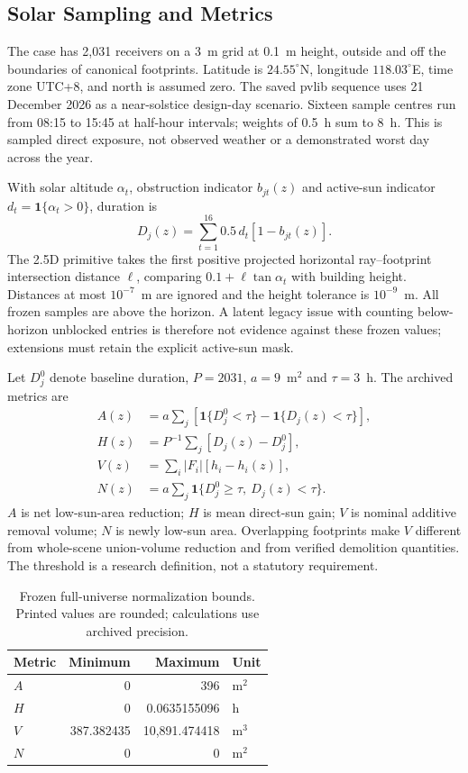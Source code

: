 \documentclass{llncs}
\newcommand{\ind}{\mathbf{1}}
\begin{document}
\subsection{Solar Sampling and Metrics}
The case has 2,031 receivers on a 3~m grid at 0.1~m height, outside and off the boundaries of canonical footprints. Latitude is $24.55^\circ$N, longitude $118.03^\circ$E, time zone UTC+8, and north is assumed zero. The saved pvlib sequence uses 21 December 2026 as a near-solstice design-day scenario. Sixteen sample centres run from 08:15 to 15:45 at half-hour intervals; weights of 0.5~h sum to 8~h. This is sampled direct exposure, not observed weather or a demonstrated worst day across the year.

With solar altitude $\alpha_t$, obstruction indicator $b_{jt}(z)$ and active-sun indicator $d_t=\ind\{\alpha_t>0\}$, duration is
\begin{equation}
 D_j(z)=\sum_{t=1}^{16}0.5\,d_t[1-b_{jt}(z)].
\label{eq:duration}
\end{equation}
The 2.5D primitive takes the first positive projected horizontal ray--footprint intersection distance $\ell$, comparing $0.1+\ell\tan\alpha_t$ with building height. Distances at most $10^{-7}$~m are ignored and the height tolerance is $10^{-9}$~m. All frozen samples are above the horizon. A latent legacy issue with counting below-horizon unblocked entries is therefore not evidence against these frozen values; extensions must retain the explicit active-sun mask.

Let $D_j^0$ denote baseline duration, $P=2031$, $a=9$~m$^2$ and $\tau=3$~h. The archived metrics are
\begin{align}
 A(z)&=a\sum_j[\ind\{D_j^0<\tau\}-\ind\{D_j(z)<\tau\}],\label{eq:A}\\
 H(z)&=P^{-1}\sum_j[D_j(z)-D_j^0],\label{eq:H}\\
 V(z)&=\sum_i|F_i|[h_i-h_i(z)],\label{eq:V}\\
 N(z)&=a\sum_j\ind\{D_j^0\geq\tau,\ D_j(z)<\tau\}.\label{eq:N}
\end{align}
$A$ is net low-sun-area reduction; $H$ is mean direct-sun gain; $V$ is nominal additive removal volume; $N$ is newly low-sun area. Overlapping footprints make $V$ different from whole-scene union-volume reduction and from verified demolition quantities. The threshold is a research definition, not a statutory requirement.

\begin{table}[tbp]\caption{Frozen full-universe normalization bounds. Printed values are rounded; calculations use archived precision.}\label{tab:bounds}\centering
\begin{tabular}{lrrl}\toprule Metric & Minimum & Maximum & Unit\\\midrule
$A$ & 0 & 396 & m$^2$\\ $H$ & 0 & 0.0635155096 & h\\ $V$ & 387.382435 & 10,891.474418 & m$^3$\\ $N$ & 0 & 0 & m$^2$\\\bottomrule\end{tabular}\end{table}
\end{document}
